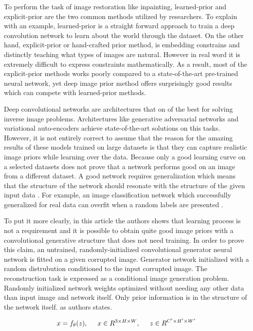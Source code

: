 To perform the task of image restoration like inpainting, learned-prior and explicit-prior are the two common methods utilized by researchers. To explain with an example, learned-prior is a straight forward approach to train a deep convolution network to learn about the world through the dataset. On the other hand, explicit-prior or hand-crafted prior method, is embedding constrains and distinctly teaching what types of images are natural. However in real word it is extremely difficult to express constraints mathematically. As a result, most of the explicit-prior methods works poorly compared to a state-of-the-art pre-trained neural network, yet deep image prior method offers surprisingly good results which can compete with learned-prior methods.

Deep convolutional networks are architectures that on of the best for solving inverse image problems. Architectures like generative adversarial networks and variational auto-encoders achieve state-of-the-art solutions on this tasks. However, it is not entirely correct to assume that the reason for the amazing results of these models trained on large datasets is that they can capture realistic image priors while learning over the data. Because only a good learning curve on a selected datasets does not prove that a network performs good on an image from a different dataset. A good network requires generalization which means that the structure of the network should resonate with the structure of the given input data \cite{deep_image_prior}. For example, an image classification network which successfully generalized for real data can overfit when a random labels are presented \cite{understanding_deeplearning}.

To put it more clearly, in this article the authors shows that learning process is not a requirement and it is possible to obtain quite good image priors with a convolutional generative structure that does not need training. In order to prove this claim, an untrained, randomly-initialized convolutional generator neural network is fitted on a given corrupted image. Generator network initialized with a random distrubution conditioned to the input corrupted image. The reconstruction task is expressed as a conditional image generation problem. Randomly initialized network weights optimized without needing any other data than input image and network itself. Only prior information is in the structure of the network itself. \cite{deep_image_prior} as authors states.

\begin{equation}
    x = f_{\theta}(z), \hspace{5mm} x \in R^{3\times H \times W}, \hspace{5mm} z \in R^{C'\times H' \times W'}
    \label{eq:prior_mapping}
\end{equation}

